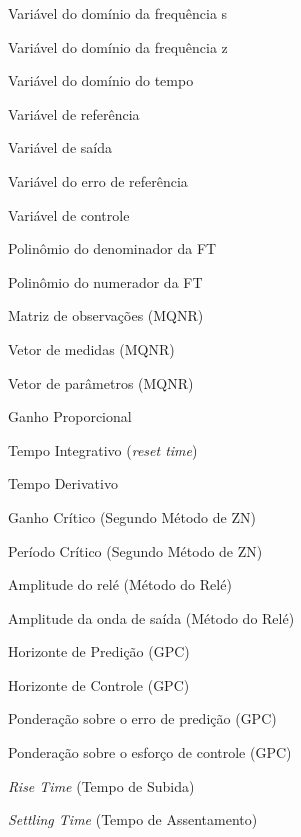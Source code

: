 
\begin{simbolos} \itemsep -1pt
    \item[$ s $] Variável do domínio da frequência s
    \item[$ z $] Variável do domínio da frequência z
	\item[$ t $] Variável do domínio do tempo
    \item[$ r(t) $] Variável de referência
    \item[$ y(t) $] Variável de saída
    \item[$ e(t) $] Variável do erro de referência
	\item[$ u(t) $] Variável de controle
    \item[$ A(z^{-1}) $] Polinômio do denominador da \gls{FT}
    \item[$ B(z^{-1}) $] Polinômio do numerador da \gls{FT}
	\item[$ \Phi $] Matriz de observações (\gls{MQNR})
    \item[$ \varphi $] Vetor de medidas (\gls{MQNR})
    \item[$ \theta $] Vetor de parâmetros (\gls{MQNR})
    \item[$ K_{p} $] Ganho Proporcional
    \item[$ T_{i} $] Tempo Integrativo (\textit{reset time})
    \item[$ T_{d} $] Tempo Derivativo
    \item[$ K_{cr} $] Ganho Crítico (Segundo Método de \gls{ZN})
    \item[$ P_{cr} $] Período Crítico (Segundo Método de \gls{ZN})
    \item[$ d $] Amplitude do relé (Método do Relé)
    \item[$ a $] Amplitude da onda de saída (Método do Relé)
    \item[$ N_y $] Horizonte de Predição (\gls{GPC})
    \item[$ N_u $] Horizonte de Controle (\gls{GPC})
    \item[$ \delta $] Ponderação sobre o erro de predição (\gls{GPC})
	\item[$ \lambda $] Ponderação sobre o esforço de controle (\gls{GPC})
    \item[$ t_r $] \textit{Rise Time} (Tempo de Subida)
    \item[$ t_s $] \textit{Settling Time} (Tempo de Assentamento)
\end{simbolos}